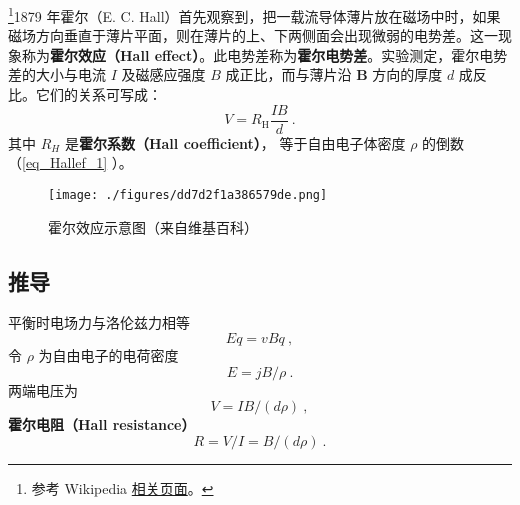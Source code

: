 
\begin{issues}
\issueDraft
\end{issues}

\footnote{参考 Wikipedia \href{https://en.wikipedia.org/wiki/Hall_effect}{相关页面}。}1879 年霍尔（E. C. Hall）首先观察到，把一载流导体薄片放在磁场中时，如果磁场方向垂直于薄片平面，则在薄片的上、下两侧面会出现微弱的电势差。这一现象称为\textbf{霍尔效应（Hall effect）}。此电势差称为\textbf{霍尔电势差}。实验测定，霍尔电势差的大小与电流 $I$ 及磁感应强度 $B$ 成正比，而与薄片沿 $\mathbf B$ 方向的厚度 $d$ 成反比。它们的关系可写成：
\begin{equation}
V = R_{\mathrm{H}} \frac{I B}{d}~.
\end{equation}
其中 $R_H$ 是\textbf{霍尔系数（Hall coefficient）}， 等于自由电子体密度 $\rho$ 的倒数（\autoref{eq_Hallef_1} ）。

\begin{figure}[ht]
\centering
\texttt{[image: ./figures/dd7d2f1a386579de.png]}
\caption{霍尔效应示意图（来自维基百科）} \label{fig_Hallef_1}
\end{figure}

\subsection{推导}
平衡时电场力与洛伦兹力相等
\begin{equation}
Eq = vBq~,
\end{equation}
令 $\rho$ 为自由电子的电荷密度
\begin{equation}
E = jB/\rho~.
\end{equation}
两端电压为
\begin{equation}\label{eq_Hallef_1}
V = IB/(d\rho)~,
\end{equation}
\textbf{霍尔电阻（Hall resistance）}
\begin{equation}
R = V/I = B/(d\rho)~.
\end{equation}
